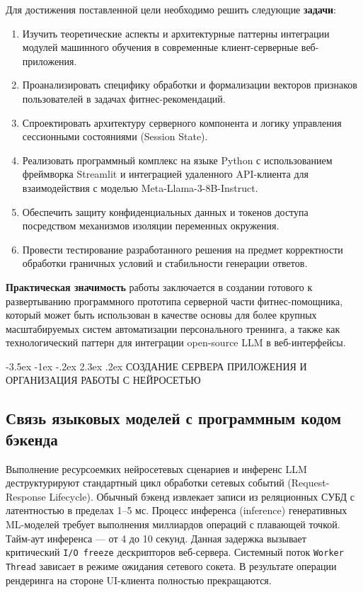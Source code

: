 \documentclass[14pt, a4paper]{extarticle}
\makeatletter
\renewcommand\section{\@startsection {section}{1}{\z@}%
                                   {-3.5ex \@plus -1ex \@minus -.2ex}%
                                   {2.3ex \@plus.2ex}%
                                   {\centering\normalfont\Large\bfseries}}
\makeatother
\begin{document}
Для достижения поставленной цели необходимо решить следующие \textbf{задачи}:
\begin{enumerate}
    \item Изучить теоретические аспекты и архитектурные паттерны интеграции модулей машинного обучения в современные клиент-серверные веб-приложения.
    \item Проанализировать специфику обработки и формализации векторов признаков пользователей в задачах фитнес-рекомендаций.
    \item Спроектировать архитектуру серверного компонента и логику управления сессионными состояниями (Session State).
    \item Реализовать программный комплекс на языке Python с использованием фреймворка Streamlit и интеграцией удаленного API-клиента для взаимодействия с моделью Meta-Llama-3-8B-Instruct.
    \item Обеспечить защиту конфиденциальных данных и токенов доступа посредством механизмов изоляции переменных окружения.
    \item Провести тестирование разработанного решения на предмет корректности обработки граничных условий и стабильности генерации ответов.
\end{enumerate}

\textbf{Практическая значимость} работы заключается в создании готового к развертыванию программного прототипа серверной части фитнес-помощника, который может быть использован в качестве основы для более крупных масштабируемых систем автоматизации персонального тренинга, а также как технологический паттерн для интеграции open-source LLM в веб-интерфейсы.




\newpage
\newpage
\section{СОЗДАНИЕ СЕРВЕРА ПРИЛОЖЕНИЯ И ОРГАНИЗАЦИЯ РАБОТЫ С НЕЙРОСЕТЬЮ}
\subsection{Связь языковых моделей с программным кодом бэкенда}

Выполнение ресурсоемких нейросетевых сценариев и инференс LLM деструктурируют стандартный цикл обработки сетевых событий (Request-Response Lifecycle). Обычный бэкенд извлекает записи из реляционных СУБД с латентностью в пределах 1--5 мс. Процесс инференса (inference) генеративных ML-моделей требует выполнения миллиардов операций с плавающей точкой. Тайм-аут инференса --- от 4 до 10 секунд. Данная задержка вызывает критический \texttt{I/O freeze} дескрипторов веб-сервера. Системный поток \texttt{Worker Thread} зависает в режиме ожидания сетевого сокета. В результате операции рендеринга на стороне UI-клиента полностью прекращаются.
\end{document}
